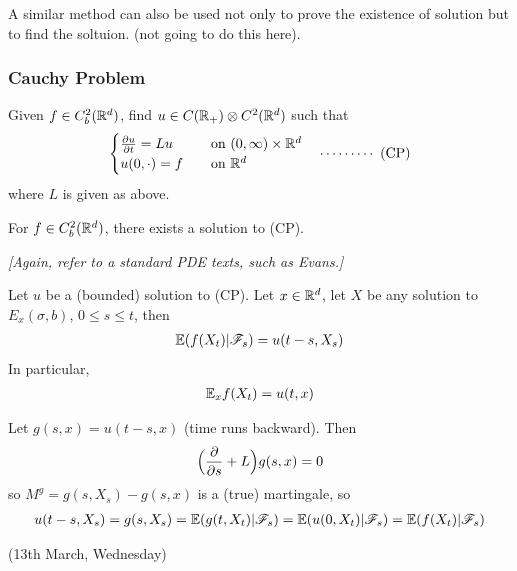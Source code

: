 \documentclass[12pt,a4paper]{article}
\newenvironment{proof}
{\begin{changemargin}{0.5cm}{0.5cm} 
	}%
	{\end{changemargin}
}
\newenvironment{p}
{\begin{proof} 
	}%
	{\end{proof}
}
\begin{document}
A similar method can also be used not only to prove the existence of solution but to find the soltuion. (not going to do this here).
\s

\subsubsection*{Cauchy Problem}

Given $f\in C_b^2(\mathbb{R}^d)$, find $u\in C(\mathbb{R}_+) \otimes C^2(\mathbb{R}^d)$ such that
\begin{align*}
\begin{cases}
\frac{\partial u}{\partial t} = Lu \quad & \text{on } (0, \infty) \times \mathbb{R}^d \\
u(0, \cdot) =f \quad & \text{on }\mathbb{R}^d
\end{cases} \quad \cdots\cdots\cdots\,\,(\text{CP})
\end{align*}
where $L$ is given as above.
\s

\thm For $f\in C_b^2(\mathbb{R}^d)$, there exists a solution to (CP).

\emph{[Again, refer to a standard PDE texts, such as Evans.]}
\s

\thm Let $u$ be a (bounded) solution to (CP). Let $x\in \mathbb{R}^d$, let $X$ be any solution to $E_x(\sigma, b)$, $0\leq s\leq t$, then
\begin{align*}
\mathbb{E}(f(X_t ) | \mathscr{F}_s) = u(t-s, X_s)
\end{align*}
In particular,
\begin{align*}
\mathbb{E}_x f(X_t) = u(t, x)
\end{align*}
\begin{p}
\pf Let $g(s, x) = u(t-s, x)$ (time runs backward). Then
\begin{align*}
\Big(\frac{\partial}{\partial s} + L \Big) g(s, x) = 0
\end{align*}
so $M^g = g(s, X_s) - g(s,x)$ is a (true) martingale, so
\begin{align*}
u(t-s, X_s) = g(s, X_s) = \mathbb{E} (g(t, X_t) | \mathscr{F}_s )= \mathbb{E} (u(0, X_t) | \mathscr{F}_s) = \mathbb{E}(f(X_t)| \mathscr{F}_s)
\end{align*}
\eop
\end{p}
\s
\s

\newday

(13th March, Wednesday)
\s
\end{document}
